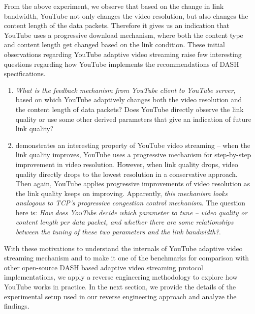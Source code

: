 From the above experiment, we observe that based on the change in link bandwidth, YouTube not only changes the video resolution, but also changes the content length of the data packets. Therefore it gives us an indication that YouTube uses a progressive download mechanism, where both the content type and content length get changed based on the link condition. These initial observations regarding YouTube adaptive video streaming raise few interesting questions regarding how YouTube implements the recommendations of \ac{DASH} specifications. 
\begin{enumerate}
	\item {\em What is the feedback mechanism from YouTube client to YouTube server}, based on which YouTube adaptively changes both the video resolution and the content length of data packets?  Does YouTube directly observe the link quality or use some other derived parameters that give an indication of future link quality? 
	\item \fig{\ref{fig:reso}} demonstrates an interesting property of YouTube video streaming -- when the link quality improves, YouTube uses a progressive mechanism for step-by-step improvement in video resolution. However, when link quality drops, video quality directly drops to the lowest resolution in a conservative approach. Then again, YouTube applies progressive improvements of video resolution as the link quality keeps on improving. Apparently, {\em this mechanism looks analogous to \ac{TCP}'s progressive congestion control mechanism}. The question here is: {\em How does YouTube decide which parameter to tune -- video quality or content length per data packet, and whether there are some relationships between the tuning of these two parameters and the link bandwidth?}.  
\end{enumerate}

With these motivations to understand the internals of YouTube adaptive video streaming mechanism and to make it one of the benchmarks for comparison with other open-source \ac{DASH} based adaptive video streaming protocol implementations, we apply a reverse engineering methodology to explore how YouTube works in practice. In the next section, we provide the details of the experimental setup used in our reverse engineering approach and analyze the findings.


